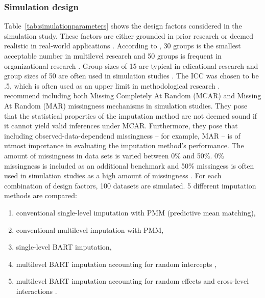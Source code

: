 \documentclass[10pt, a4paper, titlepage]{article}
\begin{document}
\subsubsection{Simulation design} 
Table~\ref{tab:simulationparameters} shows the design factors considered in the simulation study. These factors are either grounded in prior research or deemed realistic in real-world applications \citep{gulliford1999, murray2003, hox2017, grund2018, enders2018a, enders2020}. According to \citet{kreft2007}, 30 groups is the smallest acceptable number in multilevel research and 50 groups is frequent in organizational research \citep{maas2005}. Group sizes of 15 are typical in edicational research \citep{ludtke2017} and group sizes of 50 are often used in simulation studies \citep{maas2005,enders2018,akkayahocagil2023,grund2018,enders2018a,enders2020}. The ICC was chosen to be .5, which is often used as an upper limit in methodological research \citep{enders2020,enders2018,enders2018a,mistler2017,grund2018,salditt2023}.~\citet{oberman2023} recommend including both Missing Completely At Random (MCAR) and Missing At Random (MAR) missingness mechanisms in simulation studies. They pose that the statistical properties of the imputation method are not deemed sound if it cannot yield valid inferences under MCAR. Furthermore, they pose that including observed-data-dependend missingness -- for example, MAR -- is of utmost importance in evaluating the imputation method's performance. The amount of missingness in data sets is varied between 0\% and 50\%. 0\% missingness is included as an additional benchmark and 50\% missingess is often used in simulation studies as a high amount of missingness \citep{ludtke2017,grund2016,schouten2021}. For each combination of design factors, 100 datasets are simulated. 5 different imputation methods are compared: 
\begin{enumerate}
    \item conventional single-level imputation with PMM (predictive mean matching),
    \item conventional multilevel imputation with PMM,
    \item single-level BART imputation,
    \item multilevel BART imputation accounting for random intercepts \citep{chen2020, wagner2020, tan2016},
    \item multilevel BART imputation accounting for random effects and cross-level interactions \citep{dorie2022}.
\end{enumerate} 
\end{document}
